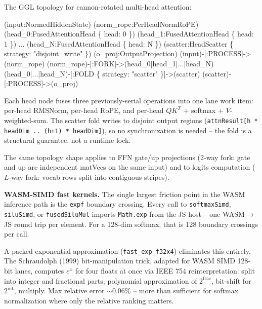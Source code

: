 \documentclass[
  11pt,
]{article}
\newenvironment{Shaded}{}{}
\newcommand{\NormalTok}[1]{#1}
\begin{document}
The GGL topology for cannon-rotated multi-head attention:

\begin{Shaded}
\begin{Highlighting}[]
\NormalTok{(input:NormedHiddenState)}
\NormalTok{(norm\_rope:PerHeadNormRoPE)}
\NormalTok{(head\_0:FusedAttentionHead \{ head: 0 \})}
\NormalTok{(head\_1:FusedAttentionHead \{ head: 1 \})}
\NormalTok{...}
\NormalTok{(head\_N:FusedAttentionHead \{ head: N \})}
\NormalTok{(scatter:HeadScatter \{ strategy: "disjoint\_write" \})}
\NormalTok{(o\_proj:OutputProjection)}
\NormalTok{(input){-}[:PROCESS]{-}\textgreater{}(norm\_rope)}
\NormalTok{(norm\_rope){-}[:FORK]{-}\textgreater{}(head\_0|head\_1|...|head\_N)}
\NormalTok{(head\_0|...|head\_N){-}[:FOLD \{ strategy: "scatter" \}]{-}\textgreater{}(scatter)}
\NormalTok{(scatter){-}[:PROCESS]{-}\textgreater{}(o\_proj)}
\end{Highlighting}
\end{Shaded}

Each head node fuses three previously-serial operations into one lane work item: per-head RMSNorm, per-head RoPE, and per-head \(QK^T\) + softmax + \(V\)-weighted-sum.  The scatter fold writes to disjoint output regions (\texttt{attnResult[h * headDim .. (h+1) * headDim]}), so no synchronization is needed -- the fold is a structural guarantee, not a runtime lock.

The same topology shape applies to FFN gate/up projections (2-way fork: gate and up are independent matVecs on the same input) and to logits computation (\(L\)-way fork: vocab rows split into contiguous stripes).

\textbf{WASM-SIMD fast kernels.}  The single largest friction point in the WASM inference path is the \texttt{expf} boundary crossing.  Every call to \texttt{softmaxSimd}, \texttt{siluSimd}, or \texttt{fusedSiluMul} imports \texttt{Math.exp} from the JS host -- one WASM\(\to\)JS round trip per element.  For a 128-dim softmax, that is 128 boundary crossings per call.

A packed exponential approximation (\texttt{fast\_exp\_f32x4}) eliminates this entirely.  The Schraudolph (1999) bit-manipulation trick, adapted for WASM SIMD 128-bit lanes, computes \(e^x\) for four floats at once via IEEE 754 reinterpretation: split into integer and fractional parts, polynomial approximation of \(2^{\text{frac}}\), bit-shift for \(2^{\text{int}}\), multiply.  Max relative error \(\sim\)0.06\% -- more than sufficient for softmax normalization where only the relative ranking matters.
\end{document}
